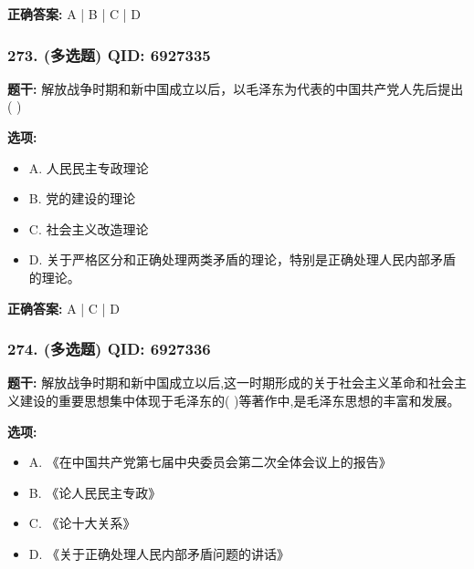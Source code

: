 \documentclass[12pt,UTF8]{ctexart}
\begin{document}
\textbf{正确答案:}
A | B | C | D

\vspace{0.3em}\hrulefill\vspace{0.7em}

\subsubsection*{273. (多选题) \small QID: 6927335}

\textbf{题干:}
解放战争时期和新中国成立以后，以毛泽东为代表的中国共产党人先后提出(   )

\textbf{选项:}
\begin{itemize}[leftmargin=*]

  \item A. 人民民主专政理论

  \item B. 党的建设的理论

  \item C. 社会主义改造理论

  \item D. 关于严格区分和正确处理两类矛盾的理论，特别是正确处理人民内部矛盾的理论。

\end{itemize}

\textbf{正确答案:}
A | C | D

\vspace{0.3em}\hrulefill\vspace{0.7em}

\subsubsection*{274. (多选题) \small QID: 6927336}

\textbf{题干:}
解放战争时期和新中国成立以后,这一时期形成的关于社会主义革命和社会主义建设的重要思想集中体现于毛泽东的(   )等著作中,是毛泽东思想的丰富和发展。

\textbf{选项:}
\begin{itemize}[leftmargin=*]

  \item A. 《在中国共产党第七届中央委员会第二次全体会议上的报告》

  \item B. 《论人民民主专政》

  \item C. 《论十大关系》

  \item D. 《关于正确处理人民内部矛盾问题的讲话》

\end{itemize}
\end{document}
